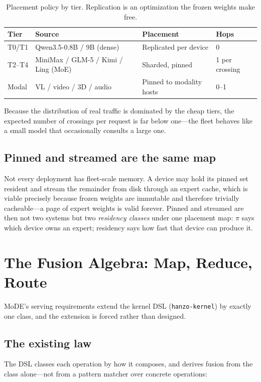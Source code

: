 \documentclass[11pt,a4paper]{article}
\begin{document}
\begin{table}[H]
\centering
\caption{Placement policy by tier. Replication is an optimization the frozen weights make free.}
\begin{tabular}{llll}
\toprule
\textbf{Tier} & \textbf{Source} & \textbf{Placement} & \textbf{Hops} \\
\midrule
T0/T1   & Qwen3.5-0.8B / 9B (dense) & Replicated per device & 0 \\
T2--T4  & MiniMax / GLM-5 / Kimi / Ling (MoE) & Sharded, pinned & 1 per crossing \\
Modal   & VL / video / 3D / audio & Pinned to modality hosts & 0--1 \\
\bottomrule
\end{tabular}
\end{table}

Because the distribution of real traffic is dominated by the cheap tiers, the expected
number of crossings per request is far below one---the fleet behaves like a small model
that occasionally consults a large one.

\subsection{Pinned and streamed are the same map}

Not every deployment has fleet-scale memory. A device may hold its pinned set resident
and stream the remainder from disk through an expert cache, which is viable precisely
because frozen weights are immutable and therefore trivially cacheable---a page of expert
weights is valid forever. Pinned and streamed are then not two systems but two
\emph{residency classes} under one placement map: $\pi$ says which device owns an expert;
residency says how fast that device can produce it.

\section{The Fusion Algebra: Map, Reduce, Route}

MoDE's serving requirements extend the kernel DSL (\texttt{hanzo-kernel}) by exactly one
class, and the extension is forced rather than designed.

\subsection{The existing law}

The DSL classes each operation by how it composes, and derives fusion from the class
alone---not from a pattern matcher over concrete operations:
\end{document}
